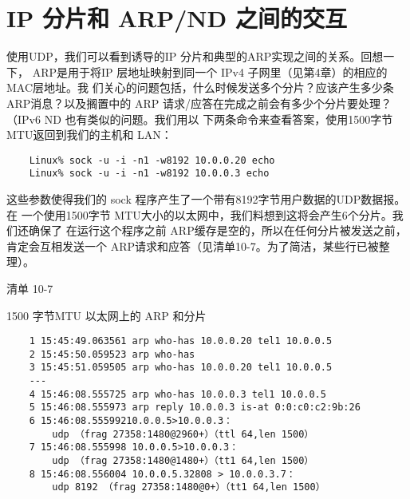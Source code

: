 \iffalse
\begin{tcolorbox}
\href{https://www.rfc-editor.org/rfc/rfc1191}{[RFC1191]}推荐一个由PMTUD得到的PMTU 值在10分钟后过时。路
径MTU 发现有时会因为防火墙和网关过滤可能不加选择地丢弃ICMP 流量而
出现问题，这会损害 PMTU 发现算法。因为这点，从基于系统范畴或有更好保
证来看，可能要关闭PMTU发现。在Linux 中，文件/proc/sys/net/ipv4/ip\_no\_
Pmtu\_disc 可以置成1以关闭PMTU发现。在 Windows 中，可以编辑注册表入口
\verb|HKEY_LOCAL_MACHINE\System CurrentControl Set Services Topip Parameters
EnablePMTUDiscovery| 的值0。一个不使用ICMP 的、传统 PMTUD 的替代品已
经被开发出来\href{https://www.rfc-editor.org/rfc/rfc4821}{[RFC4821]}，我们将在第15 章介绍它。
\end{tcolorbox}
\fi

\section{IP 分片和 ARP/ND 之间的交互}

使用UDP，我们可以看到诱导的IP 分片和典型的ARP实现之间的关系。回想一下，
ARP是用于将IP 层地址映射到同一个 IPv4 子网里（见第4章）的相应的MAC层地址。我
们关心的问题包括，什么时候发送多个分片？应该产生多少条ARP消息？以及搁置中的
ARP 请求/应答在完成之前会有多少个分片要处理？（IPv6 ND 也有类似的问题。我们用以
下两条命令来查看答案，使用1500字节 MTU返回到我们的主机和 LAN：

\begin{verbatim}
    Linux% sock -u -i -n1 -w8192 10.0.0.20 echo
    Linux% sock -u -i -n1 -w8192 10.0.0.3 echo
\end{verbatim}

这些参数使得我们的 sock 程序产生了一个带有8192字节用户数据的UDP数据报。在
一个使用1500字节 MTU大小的以太网中，我们料想到这将会产生6个分片。我们还确保了
在运行这个程序之前 ARP缓存是空的，所以在任何分片被发送之前，肯定会互相发送一个
ARP请求和应答（见清单10-7。为了简洁，某些行已被整理）。

清单 10-7

1500 字节MTU 以太网上的 ARP 和分片

\begin{verbatim}
    1 15:45:49.063561 arp who-has 10.0.0.20 tel1 10.0.0.5
    2 15:45:50.059523 arp who-has
    3 15:45:51.059505 arp who-has 10.0.0.20 tel1 10.0.0.5
    ---
    4 15:46:08.555725 arp who-has 10.0.0.3 tel1 10.0.0.5
    5 15:46:08.555973 arp reply 10.0.0.3 is-at 0:0:c0:c2:9b:26
    6 15:46:08.55599210.0.0.5>10.0.0.3：
        udp （frag 27358:1480@2960+）（ttl 64,len 1500）
    7 15:46:08.555998 10.0.0.5>10.0.0.3：
        udp （frag 27358:1480@1480+）（tt1 64,len 1500）
    8 15:46:08.556004 10.0.0.5.32808 > 10.0.0.3.7：
        udp 8192 （frag 27358:1480@0+）（tt1 64,len 1500）
\end{verbatim}

